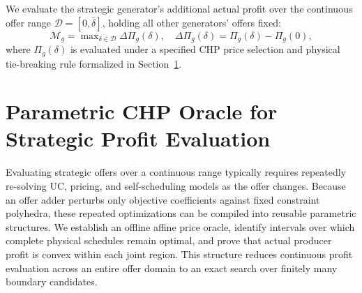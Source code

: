\documentclass[journal]{IEEEtran}
\newcommand{\blambda}{\bm\lambda}
\newcommand{\UC}{\mathrm{UC}}
\newcommand{\SSched}{\mathrm{SS}}
\begin{document}
We evaluate the strategic generator's additional actual profit over the continuous offer range $\mathcal{D}=[0,\bar\delta]$, holding all other generators' offers fixed:
\begin{equation}
\mathcal{M}_g = \max\nolimits_{\delta\in\mathcal{D}}\Delta\Pi_g(\delta), \quad
\Delta\Pi_g(\delta) = \Pi_g(\delta) - \Pi_g(0),\label{eq:marketpower}
\end{equation}
where $\Pi_g(\delta)$ is evaluated under a specified CHP price selection and physical tie-breaking rule formalized in Section~\ref{sec:method}.


\section{Parametric CHP Oracle for Strategic Profit Evaluation}
\label{sec:method}

Evaluating strategic offers over a continuous range typically requires repeatedly re-solving UC, pricing, and self-scheduling models as the offer changes. Because an offer adder perturbs only objective coefficients against fixed constraint polyhedra, these repeated optimizations can be compiled into reusable parametric structures. We establish an offline affine price oracle, identify intervals over which complete physical schedules remain optimal, and prove that actual producer profit is convex within each joint region. This structure reduces continuous profit evaluation across an entire offer domain to an exact search over finitely many boundary candidates.
\end{document}

